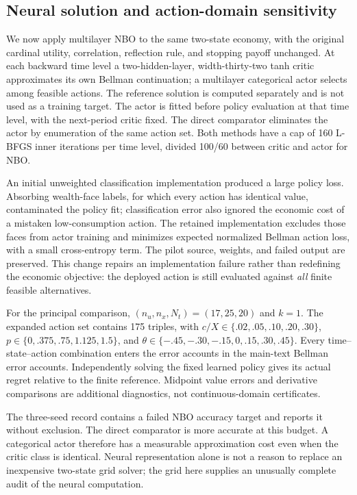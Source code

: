 \subsection{Neural solution and action-domain sensitivity}\label{sec:ndu-neural}
We now apply multilayer NBO to the same two-state economy, with the original cardinal utility, correlation, reflection rule, and stopping payoff unchanged. At each backward time level a two-hidden-layer, width-thirty-two tanh critic approximates its own Bellman continuation; a multilayer categorical actor selects among feasible actions. The reference solution is computed separately and is not used as a training target. The actor is fitted before policy evaluation at that time level, with the next-period critic fixed. The direct comparator eliminates the actor by enumeration of the same action set. Both methods have a cap of 160 L-BFGS inner iterations per time level, divided 100/60 between critic and actor for NBO.

An initial unweighted classification implementation produced a large policy loss. Absorbing wealth-face labels, for which every action has identical value, contaminated the policy fit; classification error also ignored the economic cost of a mistaken low-consumption action. The retained implementation excludes those faces from actor training and minimizes expected normalized Bellman action loss, with a small cross-entropy term. The pilot source, weights, and failed output are preserved. This change repairs an implementation failure rather than redefining the economic objective: the deployed action is still evaluated against \emph{all} finite feasible alternatives.

For the principal comparison, $(n_u,n_x,N_t)=(17,25,20)$ and $k=1$. The expanded action set contains 175 triples, with $c/X\in\{.02,.05,.10,.20,.30\}$, $p\in\{0,.375,.75,1.125,1.5\}$, and $\theta\in\{-.45,-.30,-.15,0,.15,.30,.45\}$. Every time--state--action combination enters the error accounts in the main-text Bellman error accounts. Independently solving the fixed learned policy gives its actual regret relative to the finite reference. Midpoint value errors and derivative comparisons are additional diagnostics, not continuous-domain certificates.

The three-seed record contains a failed NBO accuracy target and reports it without exclusion. The direct comparator is more accurate at this budget. A categorical actor therefore has a measurable approximation cost even when the critic class is identical. Neural representation alone is not a reason to replace an inexpensive two-state grid solver; the grid here supplies an unusually complete audit of the neural computation.


